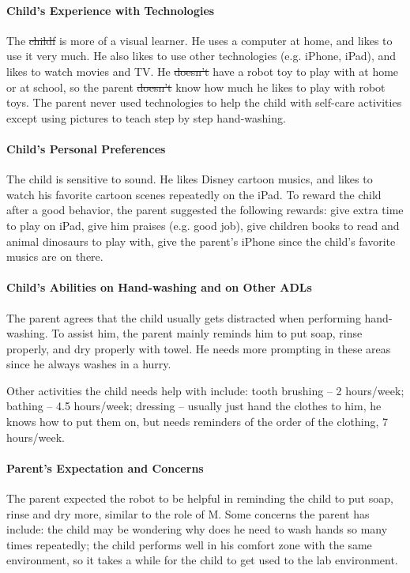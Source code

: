 \documentclass{ut-thesis}
\providecommand{\DIFaddtex}[1]{{\protect\color{blue}\uwave{#1}}} %
\providecommand{\DIFdeltex}[1]{{\protect\color{red}\sout{#1}}}                      %
\providecommand{\DIFaddbegin}{} %
\providecommand{\DIFaddend}{} %
\providecommand{\DIFdelbegin}{} %
\providecommand{\DIFdelend}{} %
\providecommand{\DIFadd}[1]{\texorpdfstring{\DIFaddtex{#1}}{#1}} %
\providecommand{\DIFdel}[1]{\texorpdfstring{\DIFdeltex{#1}}{}} %
\begin{document}
\paragraph{Child's Experience with Technologies}
The \DIFdelbegin \DIFdel{childf }\DIFdelend \DIFaddbegin \DIFadd{child }\DIFaddend is more of a visual learner.  He uses a computer at home, and likes to use it very much.  He also likes to use other technologies (e.g. iPhone, iPad), and likes to watch movies and TV.  He \DIFdelbegin \DIFdel{doesn't }\DIFdelend \DIFaddbegin \DIFadd{does not }\DIFaddend have a robot toy to play with at home or at school, so the parent \DIFdelbegin \DIFdel{doesn't }\DIFdelend \DIFaddbegin \DIFadd{does not }\DIFaddend know how much he likes to play with robot toys.  The parent never used technologies to help the child with self-care activities except using pictures to teach step by step hand-washing.

\paragraph{Child's Personal Preferences}
The child is sensitive to sound.  He likes Disney cartoon musics, and likes to watch his favorite cartoon scenes repeatedly on the iPad.  To reward the child after a good behavior, the parent suggested the following rewards: give extra time to play on iPad, give him praises (e.g. good job), give children books to read and animal dinosaurs to play with, give the parent's iPhone since the child's favorite musics are on there.

\paragraph{Child's Abilities on Hand-washing and on Other ADLs}
The parent agrees that the child usually gets distracted when performing hand-washing.  To assist him, the parent mainly reminds him to put soap, rinse properly, and dry properly with towel.  He needs more prompting in these areas since he always washes in a hurry.

Other \DIFaddbegin \DIFadd{everyday }\DIFaddend activities the child needs help with include:  tooth brushing -- 2 hours/week; bathing -- 4.5 hours/week; dressing -- usually just hand the clothes to him, he knows how to put them on, but needs reminders of the order of the clothing, 7 hours/week.

\paragraph{Parent's Expectation and Concerns}
The parent expected the robot to be helpful in reminding the child to put soap, rinse and dry more, similar to the role of M.  Some concerns the parent has include: the child may be wondering why does he need to wash hands so many times repeatedly; the child performs well in his comfort zone with the same environment, so it takes a while for the child to get used to the lab environment.
\end{document}
